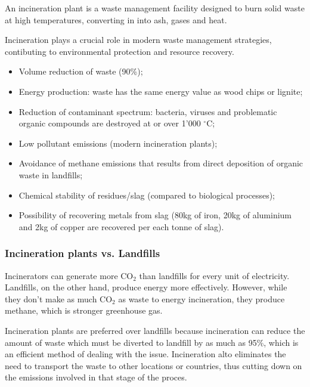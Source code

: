 \documentclass{article}
\begin{document}
An incineration plant is a waste management facility designed to burn solid waste at high temperatures,
converting in into ash, gases and heat.

Incineration plays a crucial role in modern waste management strategies, contibuting to
environmental protection and resource recovery.

\begin{itemize}
    \item Volume reduction of waste (90\%);
    \item Energy production: waste has the same energy value as wood chips or lignite;
    \item Reduction of contaminant spectrum: bacteria, viruses and problematic organic
        compounds are destroyed at or over 1'000 $^\circ$C;
    \item Low pollutant emissions (modern incineration plants);
    \item Avoidance of methane emissions that results from direct deposition of organic
        waste in landfills;
    \item Chemical stability of residues/slag (compared to biological processes);
    \item Possibility of recovering metals from slag (80kg of iron, 20kg of aluminium and 2kg of copper are recovered per each tonne of slag).
\end{itemize}

\subsubsection{Incineration plants vs. Landfills}
Incinerators can generate more CO$_2$ than landfills for every unit of electricity.
Landfills, on the other hand, produce energy more effectively. However, while
they don't make as much CO$_2$ as waste to energy incineration, they produce methane,
which is stronger greenhouse gas.

Incineration plants are preferred over landfills because incineration can reduce the amount of
waste which must be diverted to landfill by as much as 95\%, which is an efficient method
of dealing with the issue. Incineration alto eliminates the need to transport the waste to other locations
or countries, thus cutting down on the emissions involved in that stage of the proces.
\end{document}
